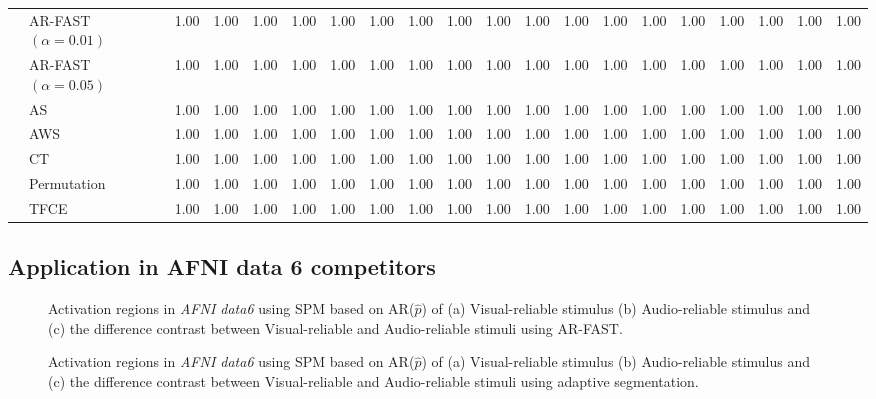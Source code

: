 \begin{table}[h]
{\begin{tabular}{|c|l|cccccc|cccccc|cccccc|}
        &  AR-FAST $(\alpha=0.01)$ & 1.00 & 1.00 & 1.00 & 1.00 & 1.00 & 1.00 & 1.00 & 1.00 & 1.00 & 1.00 & 1.00 & 1.00 & 1.00 & 1.00 & 1.00 & 1.00 & 1.00 & 1.00 \\ 
&  AR-FAST $(\alpha=0.05)$ & 1.00 & 1.00 & 1.00 & 1.00 & 1.00 & 1.00 & 1.00 & 1.00 & 1.00 & 1.00 & 1.00 & 1.00 & 1.00 & 1.00 & 1.00 & 1.00 & 1.00 & 1.00 \\ 
 & AS & 1.00 & 1.00 & 1.00 & 1.00 & 1.00 & 1.00 & 1.00 & 1.00 & 1.00 & 1.00 & 1.00 & 1.00 & 1.00 & 1.00 & 1.00 & 1.00 & 1.00 & 1.00 \\ 
  &AWS & 1.00 & 1.00 & 1.00 & 1.00 & 1.00 & 1.00 & 1.00 & 1.00 & 1.00 & 1.00 & 1.00 & 1.00 & 1.00 & 1.00 & 1.00 & 1.00 & 1.00 & 1.00 \\ 
  &CT & 1.00 & 1.00 & 1.00 & 1.00 & 1.00 & 1.00 & 1.00 & 1.00 & 1.00 & 1.00 & 1.00 & 1.00 & 1.00 & 1.00 & 1.00 & 1.00 & 1.00 & 1.00 \\ 
  & Permutation & 1.00 & 1.00 & 1.00 & 1.00 & 1.00 & 1.00 & 1.00 & 1.00 & 1.00 & 1.00 & 1.00 & 1.00 & 1.00 & 1.00 & 1.00 & 1.00 & 1.00 & 1.00 \\ 
 & TFCE & 1.00 & 1.00 & 1.00 & 1.00 & 1.00 & 1.00 & 1.00 & 1.00 & 1.00 & 1.00 & 1.00 & 1.00 & 1.00 & 1.00 & 1.00 & 1.00 & 1.00 & 1.00 \\ 
   \hline
      \end{tabular}
    }
  \end{table}


    \subsection*{Application in AFNI data 6 competitors}

    \begin{figure*}[h]
\caption{Activation regions in {\it AFNI data6} using SPM based on
  AR($\hat{p}$) of (a) Visual-reliable stimulus (b) Audio-reliable
  stimulus and (c) the  difference contrast between Visual-reliable and Audio-reliable stimuli using AR-FAST.}
\label{fig:ARSmoothingAFNI}
\end{figure*}

        \begin{figure*}[h]
\caption{Activation regions in {\it AFNI data6} using SPM based on
  AR($\hat{p}$) of (a) Visual-reliable stimulus (b) Audio-reliable
  stimulus and (c) the  difference contrast between Visual-reliable and Audio-reliable stimuli using adaptive segmentation.}
\label{fig:ASSmoothingAFNI}
\end{figure*}

